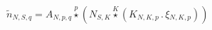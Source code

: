 \documentclass[border=2pt]{standalone}
\begin{document}
${{\tilde{n}}}{_{N, S, q}}={{A}}{_{N, p, q}} \stackrel{p}{\star} \left({N}{_{S, K}} \stackrel{K}{\star} \left({K}{_{N, K, p}} \, . \, {\xi}{_{N, K, p}}\right)\right)$
\end{document}
